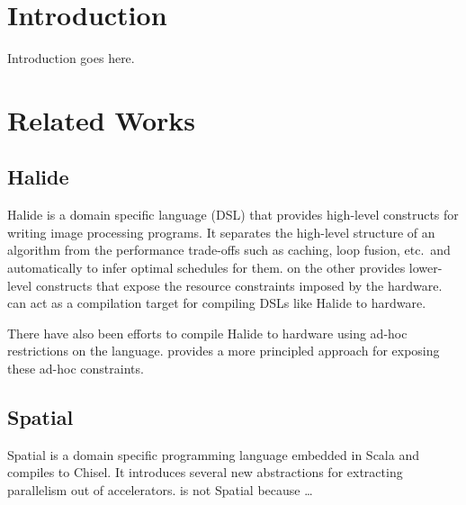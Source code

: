 \documentclass[acmsmall,review,anonymous]{acmart}\settopmatter{printfolios=true,printccs=false,printacmref=false}
\begin{document}


\maketitle

\section{Introduction}
Introduction goes here.


\section{Related Works}

\subsection{Halide}
Halide \cite{halide} is a domain specific language (DSL) that provides high-level constructs for writing image processing
programs. It separates the high-level structure of an algorithm from the
performance trade-offs such as caching, loop fusion, etc.\ and automatically to
infer optimal schedules for them. \sys{} on the other provides lower-level constructs
that expose the resource constraints imposed by the hardware. \sys{} can act as a
compilation target for compiling DSLs like Halide to hardware.

There have also been efforts to compile Halide to hardware \cite{halide-hls} using ad-hoc
restrictions on the language. \sys{} provides a more principled approach for
exposing these ad-hoc constraints.

\subsection{Spatial}
Spatial \cite{spatial} is a domain specific programming language embedded in Scala
and compiles to Chisel. It introduces several new abstractions for extracting
parallelism out of accelerators. \sys{} is not Spatial because \ldots
\end{document}

